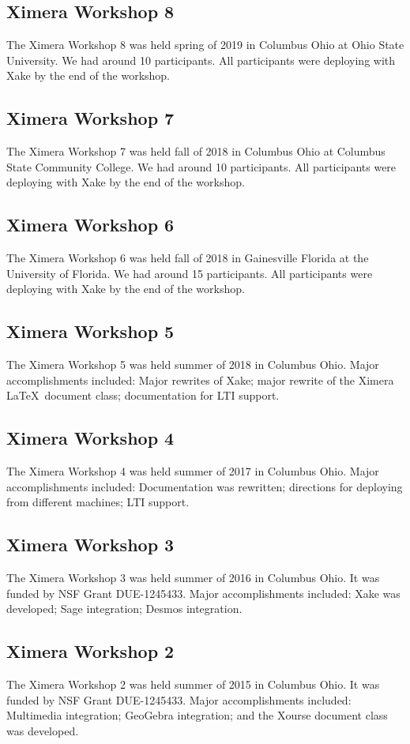 \documentclass{ximera}
\begin{document}
\subsection*{Ximera Workshop 8}
The Ximera Workshop 8 was held spring of 2019 in Columbus Ohio at Ohio State University. We had around 10 participants. All participants were deploying with Xake by the end of the workshop.

\subsection*{Ximera Workshop 7}
The Ximera Workshop 7 was held fall of 2018 in Columbus Ohio at Columbus State Community College. We had around 10 participants. All participants were deploying with Xake by the end of the workshop.

\subsection*{Ximera Workshop 6}
The Ximera Workshop 6 was held fall of 2018 in Gainesville Florida at the University of Florida. We had around 15 participants. All participants were deploying with Xake by the end of the workshop.

\subsection*{Ximera Workshop 5}
The Ximera Workshop 5 was held summer of 2018 in Columbus Ohio. Major accomplishments included: Major rewrites of Xake; major rewrite of the Ximera \LaTeX\ document class; documentation for LTI support.

\subsection*{Ximera Workshop 4}
The Ximera Workshop 4 was held summer of 2017 in Columbus Ohio. Major accomplishments included: Documentation was rewritten; directions for deploying from different machines; LTI support.

\subsection*{Ximera Workshop 3}
The Ximera Workshop 3 was held summer of 2016 in Columbus Ohio. It was funded by NSF Grant DUE-1245433. Major accomplishments included: Xake was developed; Sage integration; Desmos integration.

\subsection*{Ximera Workshop 2}
The Ximera Workshop 2 was held summer of 2015 in Columbus Ohio. It was funded by NSF Grant DUE-1245433. Major accomplishments included: Multimedia integration; GeoGebra integration; and the Xourse document class was developed.
\end{document}
